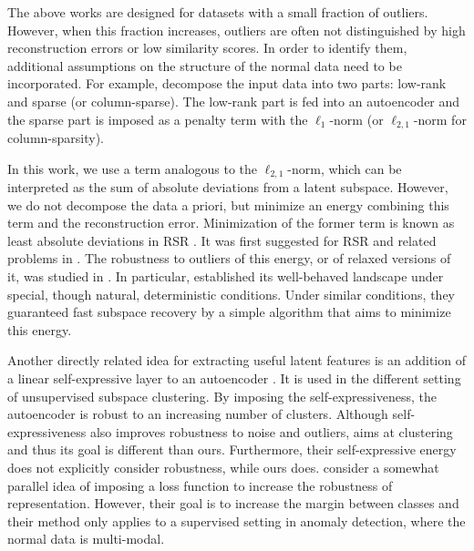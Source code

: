 \documentclass{article} \usepackage{iclr2020_conference,times}
\begin{document}
The above works are designed for datasets with a small fraction of outliers. However, when this fraction increases, outliers are often not distinguished by high reconstruction errors or low similarity scores. In order to identify them, additional assumptions on the structure
of the normal data need to be incorporated. For example, \citet{zhou2017anomaly} decompose the input data into two parts: low-rank and sparse (or column-sparse). The low-rank part is fed into an autoencoder and the sparse part is imposed as a penalty term with the $\ell_1$-norm (or $\ell_{2,1}$-norm for column-sparsity). 

In this work, we use a term analogous to the $\ell_{2,1}$-norm, which can be interpreted as the sum of absolute deviations from a latent subspace. However, we do not decompose the data a priori, but minimize an energy combining this term and the reconstruction error.  Minimization of the former term is known as least absolute deviations in RSR  \citep{lerman2018overview}. It was first suggested for RSR and related problems in \citet{watson2001some, ding2006r, zhang2009median}. The robustness to outliers of this energy, or of relaxed versions of it, was studied in \citet{mccoy2011two, xu2012robust, lp_recovery_part1_11, zhang2014novel, lerman2015robust, lerman2017fast, maunu2017well}. In particular, \citet{maunu2017well} established its well-behaved landscape under special, though natural, deterministic conditions. Under similar conditions, they guaranteed fast subspace recovery by a simple algorithm that aims to minimize this energy.

Another directly related idea 
for extracting useful latent features 
is an addition of a linear self-expressive layer to an autoencoder \citep{ji2017deep}. It is used in the different setting of unsupervised subspace clustering. By imposing the self-expressiveness, the autoencoder is robust to an increasing number of clusters. Although self-expressiveness also improves robustness to noise and outliers,
\citet{ji2017deep} aims at clustering and thus its goal is different than ours. Furthermore, their self-expressive energy does not explicitly consider robustness, while ours does.
\citet{lezama2018ole} consider a somewhat parallel idea of imposing a loss function to increase the robustness of representation. However, their goal is to increase the margin between classes and their method only applies to a supervised setting in anomaly detection, where the normal data is multi-modal.
\end{document}

